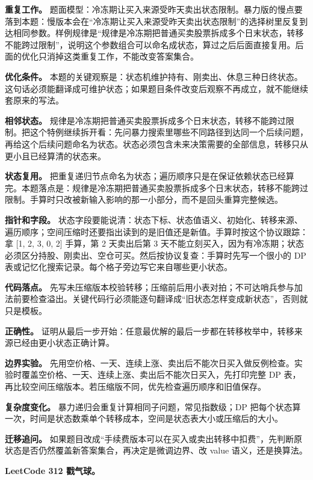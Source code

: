 \textbf{重复工作。} 题面模型：冷冻期让买入来源受昨天卖出状态限制。暴力版的慢点要落到本题：慢版本会在“冷冻期让买入来源受昨天卖出状态限制”的选择树里反复到达相同参数。样例规律是“规律是冷冻期把普通买卖股票拆成多个日末状态，转移不能跨过限制”，说明这个参数组合可以命名成状态，算过之后后面直接复用。后面的优化只消掉这类重复工作，不能改变答案集合。

\textbf{优化条件。} 本题的关键观察是：状态机维护持有、刚卖出、休息三种日终状态。这句话必须能翻译成可维护状态；如果题目条件改变后观察不再成立，就不能继续套原来的写法。

\textbf{相邻状态。} 规律是冷冻期把普通买卖股票拆成多个日末状态，转移不能跨过限制。把这个特例继续拆开看：先问暴力搜索里哪些不同路径到达同一个后续问题，再给这个后续问题命名为状态。状态必须包含未来决策需要的全部信息，转移只从更小且已经算清的状态来。

\textbf{状态复用。} 把重复递归节点命名为状态；遍历顺序只是在保证依赖状态已经算完。本题落点是：规律是冷冻期把普通买卖股票拆成多个日末状态，转移不能跨过限制。手算时只改被新输入影响的那一小部分，而不是回头重算完整候选。

\textbf{指针和字段。} 状态字段要能说清：状态下标、状态值语义、初始化、转移来源、遍历顺序；空间压缩时还要指出读到的是旧值还是新值。手算时按这个协议跟踪：拿 [1, 2, 3, 0, 2] 手算，第 2 天卖出后第 3 天不能立刻买入，因为有冷冻期；状态必须区分持股、刚卖出、空仓可买。然后按协议复查：手算时先写一个很小的 DP 表或记忆化搜索记录。每个格子旁边写它来自哪些更小状态。

\textbf{代码落点。} 先写未压缩版本校验转移；压缩前后用小表对拍；不可达哨兵参与加法前要检查溢出。关键代码行必须能逐句翻译成“旧状态怎样变成新状态”，否则就只是模板。

\textbf{正确性。} 证明从最后一步开始：任意最优解的最后一步都在转移枚举中，转移来源已经由更小状态正确计算。

\textbf{边界实验。} 先用空价格、一天、连续上涨、卖出后不能次日买入做反例检查。实验时覆盖空价格、一天、连续上涨、卖出后不能次日买入，先打印完整 DP 表，再比较空间压缩版本。若压缩版不同，优先检查遍历顺序和旧值保存。

\textbf{复杂度变化。} 暴力递归会重复计算相同子问题，常见指数级；DP 把每个状态算一次，时间是状态数乘单个转移成本，空间是状态表大小或压缩后的大小。

\textbf{迁移追问。} 如果题目改成“手续费版本可以在买入或卖出转移中扣费”，先判断原状态是否仍然覆盖新答案集合，再决定是微调边界、改 value 语义，还是换算法。

\noindent\textbf{LeetCode 312 戳气球。}

